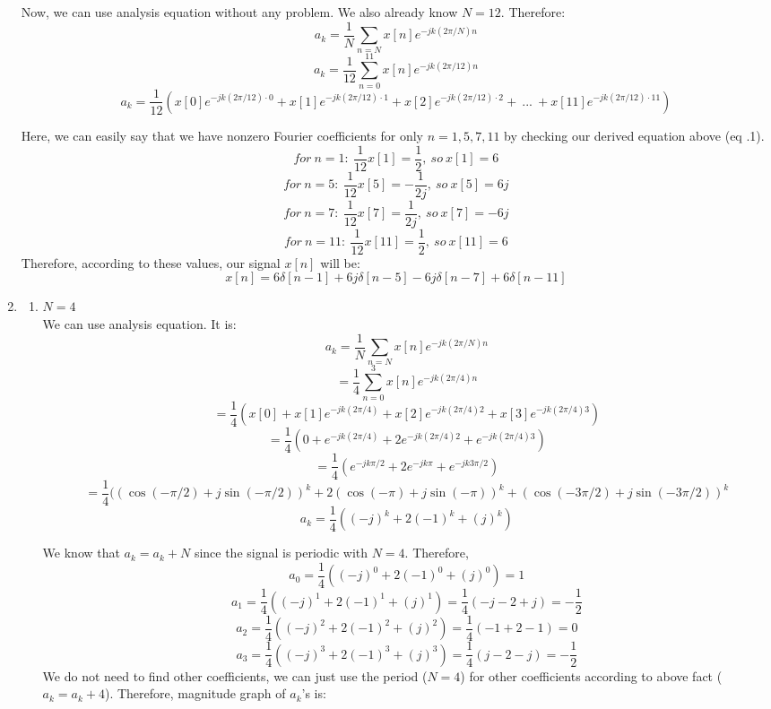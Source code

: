 \documentclass[10pt,a4paper, margin=1in]{article}
\begin{document}
\begin{enumerate}
Now, we can use analysis equation without any problem. We also already know $N=12$. Therefore:
\[ a_k = \frac{1}{N} \sum_{n=N}^{} x[n]e^{-jk(2\pi/N)n} \]
\[ a_k = \frac{1}{12} \sum_{n=0}^{11} x[n]e^{-jk(2\pi/12)n} \]
\[ a_k = \frac{1}{12} (x[0]e^{-jk(2\pi/12) \cdot 0} + x[1]e^{-jk(2\pi/12) \cdot 1} + x[2]e^{-jk(2\pi/12) \cdot 2} + \ ... \ + x[11]e^{-jk(2\pi/12) \cdot 11}) \]

Here, we can easily say that we have nonzero Fourier coefficients for only $n =  1, 5, 7, 11$ by checking our derived equation above (eq .1).
\[ for \ n=1: \ \frac{1}{12} x[1] = \frac{1}{2} , \ so \ x[1] = 6 \]
\[ for \ n=5: \ \frac{1}{12} x[5] = - \frac{1}{2j} , \ so \ x[5] = 6j \]
\[ for \ n=7: \ \frac{1}{12} x[7] = \frac{1}{2j} , \ so \ x[7] = -6j \]
\[ for \ n=11: \ \frac{1}{12} x[11] = \frac{1}{2} , \ so \ x[11] = 6 \]
Therefore, according to these values, our signal $x[n]$ will be:
\[ x[n] = 6\delta[n-1] + 6j\delta[n-5] - 6j\delta[n-7] + 6\delta[n-11] \]

\item %
    \begin{enumerate}
    \item %
    $N = 4$ \\
    We can use analysis equation. It is: \\
    \[ a_k = \frac{1}{N} \sum_{n=N}^{} x[n]e^{-jk(2\pi/N)n} \]
    \[ = \frac{1}{4} \sum_{n=0}^{3} x[n]e^{-jk(2\pi/4)n} \]
    \[ = \frac{1}{4}(x[0] + x[1]e^{-jk(2\pi/4)} + x[2]e^{-jk(2\pi/4)2} + x[3]e^{-jk(2\pi/4)3}) \]
     \[ = \frac{1}{4}(0 + e^{-jk(2\pi/4)} + 2e^{-jk(2\pi/4)2} + e^{-jk(2\pi/4)3}) \]
     \[ = \frac{1}{4}(e^{-jk \pi/2} + 2e^{-jk\pi} + e^{-jk3\pi/2}) \]
     \[ = \frac{1}{4}((\cos(-\pi/2) + j\sin(-\pi/2))^k + 2(\cos(-\pi) + j\sin(-\pi))^k + (\cos(-3\pi/2) + j\sin(-3\pi/2) )^k \]
     \[ a_k = \frac{1}{4}((-j)^k + 2(-1)^k + (j)^k) \]
     
     We know that $a_k = a_k + N$ since the signal is periodic with $N = 4$. Therefore, \\
     \[ a_0 = \frac{1}{4}((-j)^0 + 2(-1)^0 + (j)^0) = 1  \]
     \[ a_1 = \frac{1}{4}((-j)^1 + 2(-1)^1 + (j)^1) = \frac{1}{4}(-j - 2 + j) = -\frac{1}{2}  \]
     \[ a_2 = \frac{1}{4}((-j)^2 + 2(-1)^2 + (j)^2) = \frac{1}{4}(-1 + 2 -1) = 0  \]
     \[ a_3 = \frac{1}{4}((-j)^3 + 2(-1)^3 + (j)^3) = \frac{1}{4}(j - 2 -j) = - \frac{1}{2}  \]
     We do not need to find other coefficients, we can just use the period ($N=4$) for other coefficients according to above fact ($a_k = a_k + 4$). Therefore, magnitude graph of $a_k$'s is:
     

\end{enumerate}
\end{enumerate}
\end{document}

